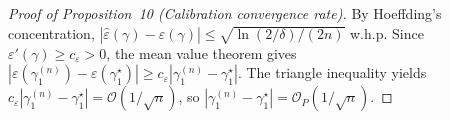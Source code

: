 \documentclass[lettersize,journal]{IEEEtran}
\begin{document}
\begin{proof}[Proof of Proposition~10 (Calibration convergence rate)]
By Hoeffding's concentration, $|\hat\varepsilon(\gamma) - \varepsilon(\gamma)| \le \sqrt{\ln(2/\delta)/(2n)}$ w.h.p.
Since $\varepsilon'(\gamma) \ge c_\varepsilon > 0$, the mean value theorem gives $|\varepsilon(\gamma_1^{(n)}) - \varepsilon(\gamma_1^\star)| \ge c_\varepsilon |\gamma_1^{(n)} - \gamma_1^\star|$.
The triangle inequality yields $c_\varepsilon |\gamma_1^{(n)} - \gamma_1^\star| = \mathcal{O}(1/\sqrt{n})$, so $|\gamma_1^{(n)} - \gamma_1^\star| = \mathcal{O}_P(1/\sqrt{n})$.
\end{proof}



\end{document}
